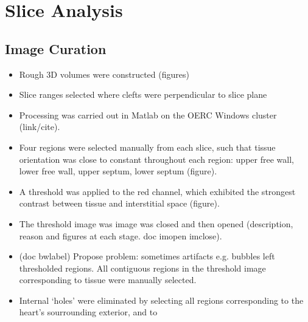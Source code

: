 \section{Slice Analysis} %
\label{sec:image:slice_analysis}

\subsection{Image Curation} %
\label{sub:image_curation}
\begin{itemize}
  \item Rough 3D volumes were constructed (figures)
  \item Slice ranges selected where clefts were perpendicular to slice plane
  \item Processing was carried out in Matlab on the OERC Windows cluster (link/cite).
  \item Four regions were selected manually from each slice, such that tissue orientation was close to constant throughout each region: upper free wall, lower free wall, upper septum, lower septum (figure).
  \item A threshold was applied to the red channel, which exhibited the strongest contrast between tissue and interstitial space (figure).
  \item The threshold image was image was closed and then opened (description, reason and figures at each stage. doc imopen imclose).
  \item (doc bwlabel) Propose problem: sometimes artifacts e.g. bubbles left thresholded regions. All contiguous regions in the threshold image corresponding to tissue were manually selected.
  \item Internal `holes' were eliminated by selecting all regions corresponding to the heart's sourrounding exterior, and to 
  
\end{itemize}
  

